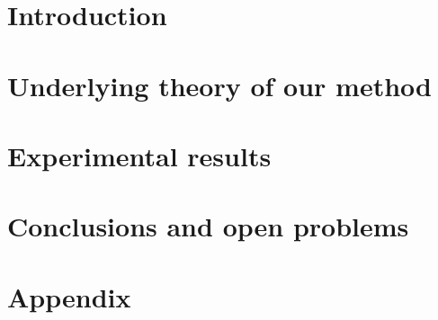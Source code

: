 \documentclass{tfg_domingo}
\begin{document}
\portada
\frontmatter
\gracias{}
\resumen{}{}
\tableofcontents

\mainmatter
\chapter{Introduction}\label{cap:Intro}
%


\chapter{Underlying theory of our method}\label{cap:Teoria}




\chapter{Experimental results}\label{cap:Resultados}
%



\chapter{Conclusions and open problems}\label{cap:Conclusiones}
%





\appendix
\chapter{Appendix}

\end{document}
